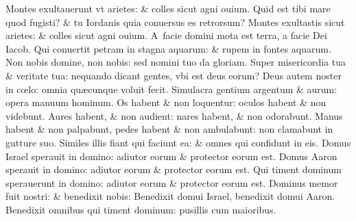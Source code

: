 \documentclass[a5paper,10pt]{book}
\def\ae{æ}
\def\oe{œ}
\begin{document}
\begin{multicols*}{2}
\newline \color{red} M\color{black}ontes exultauerunt vt arietes: \& colles sicut agni ouium.
\newline \color{red} Q\color{black}uid est tibi mare quod fugisti? \& tu Iordanis quia conuersus es retrorsum?%
\newline \color{red} M\color{black}ontes exultastis sicut arietes: \& colles sicut agni ouium.
\newline \color{red} A\color{black}\ facie domini mota est terra, a facie Dei Iacob.
\newline \color{red} Q\color{black}ui conuertit petram in stagna aquarum: \& rupem in fontes aquarum.
\newline \color{red} N\color{black}on nobis domine, non nobis: sed nomini tuo da gloriam.
\newline \color{red} S\color{black}uper misericordia tua \& veritate tua: nequando dicant gentes, vbi est deus eorum?
\newline \color{red} D\color{black}eus autem noster in c\oe lo: omnia qu\ae cunque voluit fecit.
\newline \color{red} S\color{black}imulacra gentium argentum \& aurum: opera manuum hominum.
\newline \color{red} O\color{black}s habent \& non loquentur: oculos habent \& non videbunt.
\newline \color{red} A\color{black}ures habent, \& non audient: nares habent, \& non odorabunt.
\newline \color{red} M\color{black}anus habent \& non palpabunt, pedes habent \& non ambulabunt: non clamabunt in gutture suo.
\newline \color{red} S\color{black}imiles illis fiant qui faciunt ea: \& omnes qui confidunt in eis.
\newline \color{red} D\color{black}omus Israel sperauit in domino: adiutor eorum \& protector eorum est.
\newline \color{red} D\color{black}omus Aaron sperauit in domino: adiutor eorum \& protector eorum est.
\newline \color{red} Q\color{black}ui timent dominum sperauerunt in domino: adiutor eorum \& protector eorum est.
\newline \color{red} D\color{black}ominus memor fuit nostri: \& benedixit nobis:
\newline \color{red} B\color{black}enedixit domui Israel, benedixit domui Aaron.
\newline \color{red} B\color{black}enedixit omnibus qui timent dominum: pusillis cum maioribus.

\end{multicols*}
\end{document}
